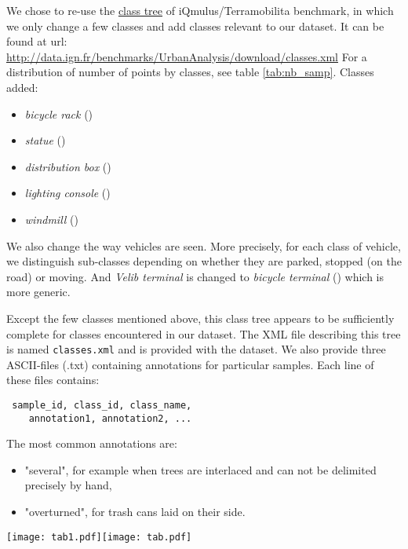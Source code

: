 \documentclass[a4paper, 10pt, journal]{article}
\begin{document}
We chose to re-use the \href{http://data.ign.fr/benchmarks/UrbanAnalysis/download/classes.xml}{class tree} of iQmulus/Terramobilita benchmark, in which we only change a few classes and add classes relevant to our dataset. It can be found at url: \url{http://data.ign.fr/benchmarks/UrbanAnalysis/download/classes.xml}
For a distribution of number of points by classes, see table \ref{tab:nb_samp}.
Classes added:
\begin{itemize}
 \item \textit{bicycle rack} ()
 \item \textit{statue} ()
 \item \textit{distribution box} ()
 \item \textit{lighting console} ()
 \item \textit{windmill} ()
\end{itemize}
We also change the way vehicles are seen. More precisely, for each class of vehicle, we distinguish sub-classes depending on whether they are parked, stopped (on the road) or moving.
And \textit{Velib terminal} is changed to \textit{bicycle terminal} () which is more generic.

Except the few classes mentioned above, this class tree appears to be sufficiently complete for classes encountered in our dataset. The XML file describing this tree is named \texttt{classes.xml} and is provided with the dataset. We also provide three ASCII-files (.txt) containing annotations for particular samples. Each line of these files contains: 
\begin{verbatim}
 sample_id, class_id, class_name,
    annotation1, annotation2, ...
\end{verbatim}

The most common annotations are:
\begin{itemize}
 \item "several", for example when trees are interlaced and can not be delimited precisely by hand,
 \item "overturned", for trash cans laid on their side.
\end{itemize}

\begin{center}\centering
 \texttt{[image: tab1.pdf]}\texttt{[image: tab.pdf]}
\end{center}
\end{document}
